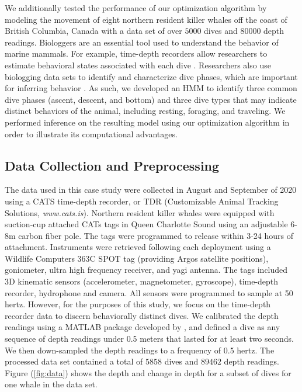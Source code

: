 
We additionally tested the performance of our optimization algorithm by modeling the movement of eight northern resident killer whales off the coast of British Columbia, Canada with a data set of over $5000$ dives and $80000$ depth readings. Biologgers are an essential tool used to understand the behavior of marine mammals. For example, time-depth recorders allow researchers to estimate behavioral states associated with each dive \citep[e.g. foraging, resting, and traveling,][]{Tennessen:2023}. Researchers also use biologging data sets to identify and characterize dive phases, which are important for inferring behavior \citep[e.g., prey capture often occurs in the bottom phase of a foraging dive,][]{Wright:2017,Jensen:2023}. As such, we developed an HMM to identify three common dive phases (ascent, descent, and bottom) and three dive types that may indicate distinct behaviors of the animal, including resting, foraging, and traveling. We performed inference on the resulting model using our optimization algorithm in order to illustrate its computational advantages.

\subsection{Data Collection and Preprocessing}

The data used in this case study were collected in August and September of 2020 using a CATS time-depth recorder, or TDR (Customizable Animal Tracking Solutions, {\em{www.cats.is}}). Northern resident killer whales were equipped with suction-cup attached CATs tags in Queen Charlotte Sound using an adjustable 6-8m carbon fiber pole. The tags were programmed to release within 3-24 hours of attachment. Instruments were retrieved following each deployment using a Wildlife Computers 363C SPOT tag (providing Argos satellite positions), goniometer, ultra high frequency receiver, and yagi antenna. The tags included 3D kinematic sensors (accelerometer, magnetometer, gyroscope), time-depth recorder, hydrophone and camera. All sensors were programmed to sample at 50 hertz. However, for the purposes of this study, we focus on the time-depth recorder data to discern behaviorally distinct dives. We calibrated the depth readings using a MATLAB package developed by \citet{Cade:2021}, and defined a dive as any sequence of depth readings under 0.5 meters that lasted for at least two seconds. We then down-sampled the depth readings to a frequency of 0.5 hertz. The processed data set contained a total of $5858$ dives and $89462$ depth readings. Figure (\ref{fig:data}) shows the depth and change in depth for a subset of dives for one whale in the data set. 

